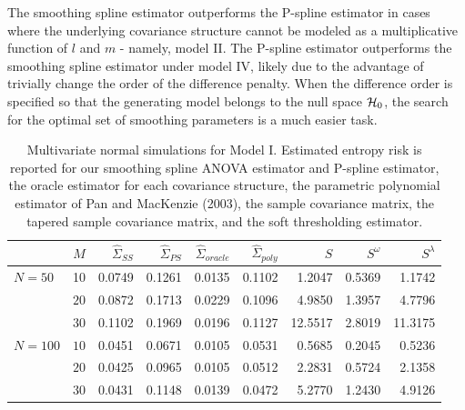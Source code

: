 The smoothing spline estimator outperforms the P-spline estimator in cases where the underlying covariance structure cannot be modeled as a multiplicative function of $l$ and $m$ - namely, model II. The P-spline estimator outperforms the smoothing spline estimator under model IV, likely due to the advantage of trivially change the order of the difference penalty. When the difference order is specified so that the generating model belongs to the null space $\mathcal{H}_0$, the search for the optimal set of smoothing parameters is a much easier task.   
 
\bigskip


%
%
\bigskip
\setlength{\dashlinedash}{0.5pt}
\setlength{\dashlinegap}{1pt}
\setlength{\arrayrulewidth}{0.2pt}
%
\begin{table}[H]
\centering
\caption{Multivariate normal simulations for Model I. Estimated entropy risk is reported for our smoothing spline ANOVA estimator and P-spline estimator, the oracle estimator for each covariance structure, the parametric polynomial estimator of Pan and MacKenzie (2003), the sample covariance matrix, the tapered sample covariance matrix, and the soft thresholding estimator.} 
\begin{tabular}{lrrrrrrrr}
 & $M$ &$\hat{\Sigma}_{SS}$& $\hat{\Sigma}_{PS}$ &$\hat{\Sigma}_{oracle}$& $\hat{\Sigma}_{poly}$ & $S$ &$S^\omega$& $S^\lambda$ \\ 
  \hline
$N = 50$ & 10 & 0.0749 & 0.1261 & 0.0135 & 0.1102 & 1.2047 & 0.5369 & 1.1742 \\ 
   & $20$ & 0.0872 & 0.1713 & 0.0229 & 0.1096 & 4.9850 & 1.3957 & 4.7796 \\ 
   & $30$ & 0.1102 & 0.1969 & 0.0196 & 0.1127 & 12.5517 & 2.8019 & 11.3175 \\ 
 $N = 100$ & $10$ & 0.0451 & 0.0671 & 0.0105 & 0.0531 & 0.5685 & 0.2045 & 0.5236 \\ 
   & $20$ & 0.0425 & 0.0965 & 0.0105 & 0.0512 & 2.2831 & 0.5724 & 2.1358 \\ 
   & $30$ & 0.0431 & 0.1148 & 0.0139 & 0.0472 & 5.2770 & 1.2430 & 4.9126 \\ 
   \hline
\end{tabular}
\label{table:simulation-1-entropy-loss-sigma-1}
\end{table}
